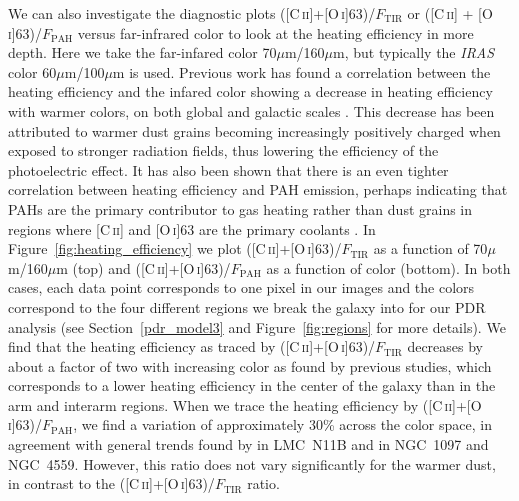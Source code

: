 We can also investigate the diagnostic plots ([C\,\textsc{ii}]+[O\,\textsc{i}]63)/$F_{\mathrm{TIR}}$ or ([C\,\textsc{ii}] + [O\,\textsc{i}]63)/$F_{\mathrm{PAH}}$ versus far-infrared color to look at the heating efficiency in more depth. Here we take the far-infared color 70$\mu$m/160$\mu$m, but typically the \emph{IRAS} color 60$\mu$m/100$\mu$m is used.  Previous work has found a correlation between the heating efficiency and the infared color showing a decrease in heating efficiency with warmer colors, on both global and galactic scales \citep[e.g.,][]{2001ApJ...561..766M,2012ApJ...747...81C}. This decrease has been attributed to warmer dust grains becoming increasingly positively charged when exposed to stronger radiation fields, thus lowering the efficiency of the photoelectric effect.  It has also been shown that there is an even tighter correlation between heating efficiency and PAH emission, perhaps indicating that PAHs are the primary contributor to gas heating rather than dust grains in regions where [C\,\textsc{ii}] and [O\,\textsc{i}]63 are the primary coolants \citep{2012ApJ...747...81C, 2012A&A...548A..91L}.  In Figure~\ref{fig:heating_efficiency} we plot ([C\,\textsc{ii}]+[O\,\textsc{i}]63)/$F_{\mathrm{TIR}}$ as a function of 70$\mu$m/160$\mu$m (top) and ([C\,\textsc{ii}]+[O\,\textsc{i}]63)/$F_{\mathrm{PAH}}$ as a function of color (bottom).  In both cases, each data point corresponds to one pixel in our images and the colors correspond to the four different regions we break the galaxy into for our PDR analysis (see Section~\ref{pdr_model3} and Figure~\ref{fig:regions} for more details).  We find that the heating efficiency as traced by ([C\,\textsc{ii}]+[O\,\textsc{i}]63)/$F_{\mathrm{TIR}}$ decreases by about a factor of two with increasing color as found by previous studies, which corresponds to a lower heating efficiency in the center of the galaxy than in the arm and interarm regions.  When we trace the heating efficiency by ([C\,\textsc{ii}]+[O\,\textsc{i}]63)/$F_{\mathrm{PAH}}$, we find a variation of approximately 30\% across the color space, in agreement with general trends found by \citet{2012A&A...548A..91L} in LMC~N11B and \citet{2012ApJ...747...81C} in NGC~1097 and NGC~4559.  However, this ratio does not vary significantly for the warmer dust, in contrast to the ([C\,\textsc{ii}]+[O\,\textsc{i}]63)/$F_{\mathrm{TIR}}$ ratio.

